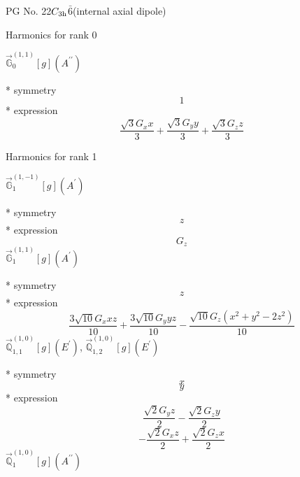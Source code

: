 \documentclass[fleqn,8pt]{jsarticle}
\begin{document}
\setcounter{MaxMatrixCols}{32}

\renewcommand{\tablename}{Table~}
\renewcommand{\figurename}{Figure~}
\begin{center}
\LARGE
PG No. 22\quad$C_{\rm 3h}$\quad$\bar{6}$\quad[ hexagonal ] (internal axial dipole)
\end{center}

\noindent * Harmonics for rank 0

\noindent\quad $\vec{\mathbb{G}}_{0}^{(1,1)}[g](A^{\prime\prime})$

\noindent\quad ** symmetry
\begin{dmath*}
1
\end{dmath*}
\noindent\quad ** expression
\begin{dmath*}
\frac{\sqrt{3} G_{x} x}{3} + \frac{\sqrt{3} G_{y} y}{3} + \frac{\sqrt{3} G_{z} z}{3}
\end{dmath*}

\noindent * Harmonics for rank 1

\noindent\quad $\vec{\mathbb{G}}_{1}^{(1,-1)}[g](A^{\prime})$

\noindent\quad ** symmetry
\begin{dmath*}
z
\end{dmath*}
\noindent\quad ** expression
\begin{dmath*}
G_{z}
\end{dmath*}
\noindent\quad $\vec{\mathbb{G}}_{1}^{(1,1)}[g](A^{\prime})$

\noindent\quad ** symmetry
\begin{dmath*}
z
\end{dmath*}
\noindent\quad ** expression
\begin{dmath*}
\frac{3 \sqrt{10} G_{x} x z}{10} + \frac{3 \sqrt{10} G_{y} y z}{10} - \frac{\sqrt{10} G_{z} \left(x^{2} + y^{2} - 2 z^{2}\right)}{10}
\end{dmath*}
\noindent\quad $\vec{\mathbb{Q}}_{1,1}^{(1,0)}[g](E^{\prime})$, $\vec{\mathbb{Q}}_{1,2}^{(1,0)}[g](E^{\prime})$

\noindent\quad ** symmetry
\begin{dmath*}
x
\end{dmath*}
\begin{dmath*}
y
\end{dmath*}
\noindent\quad ** expression
\begin{dmath*}
\frac{\sqrt{2} G_{y} z}{2} - \frac{\sqrt{2} G_{z} y}{2}
\end{dmath*}
\begin{dmath*}
- \frac{\sqrt{2} G_{x} z}{2} + \frac{\sqrt{2} G_{z} x}{2}
\end{dmath*}
\noindent\quad $\vec{\mathbb{Q}}_{1}^{(1,0)}[g](A^{\prime\prime})$
\end{document}
